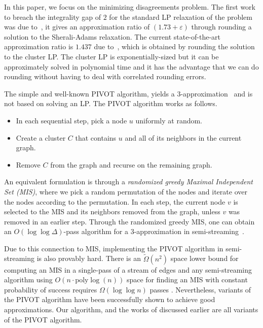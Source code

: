 \documentclass{theoretics}
\newcommand{\poly}{\mathrm{poly}}
\newcommand{\pivot}{\textrm{PIVOT}\xspace}
\newcommand{\eps}{\ensuremath{\varepsilon}}
\begin{document}
In this paper, we focus on the minimizing disagreements problem. The first work to breach the integrality gap of $2$ for the standard LP relaxation of the problem was due to~\cite{cohen2022correlation,Cohen-AddadLLN2023}, it gives an approximation ratio of $(1.73+\eps)$ through rounding a solution to the Sherali-Adams relaxation. 
The current state-of-the-art approximation ratio is $1.437$ due to~\cite{DBLP:conf/stoc/CaoCL0NV24}, which is obtained by rounding the solution to the cluster LP. The cluster LP is exponentially-sized but it can be approximately solved in polynomial time and it has the advantage that we can do rounding without having to deal with correlated rounding errors.

The simple and well-known \pivot algorithm, yields a $3$-approximation~\cite{ailon2008aggregating} and is not based on solving an LP.
The \pivot algorithm works as follows.
\begin{itemize}
    \item In each sequential step, pick a node $u$ uniformly at random.
    \item Create a cluster $C$ that contains $u$ and all of its neighbors in the current graph.
    \item Remove $C$ from the graph and recurse on the remaining graph.
\end{itemize}
An equivalent formulation is through a \emph{randomized greedy Maximal Independent Set (MIS)}, where we pick a random permutation of the nodes and iterate over the nodes according to the permutation. In each step, the current node $v$ is selected to the MIS and its neighbors removed from the graph, unless $v$ was removed in an earlier step.
Through the randomized greedy MIS, one can obtain an $O(\log \log \Delta)$-pass algorithm for a $3$-approximation in semi-streaming~\cite{ahn2015correlation}.

Due to this connection to MIS, implementing the PIVOT algorithm in semi-streaming is also provably hard. There is an $\widetilde{\Omega}(n^2)$ space lower bound for computing an MIS in a single-pass of a stream of edges \cite{cormodeDK2019} and any semi-streaming algorithm using $O(n\cdot \poly\log(n))$ space for finding an MIS with constant probability of success requires $\Omega(\log\log n)$ passes \cite{AssadiKNS2024}. Nevertheless, variants of the PIVOT algorithm have been successfully shown to achieve good approximations. Our algorithm, and the works of \cite{Behnezhad2022,behnezhad2023single,chakrabarty2023singlepass} discussed earlier are all variants of the PIVOT algorithm.
\end{document}

